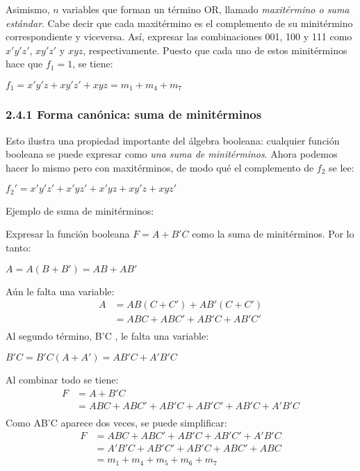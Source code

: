 Asimismo, $n$ variables que forman un t\'{e}rmino OR, llamado
\textit{maxit\'{e}rmino o suma est\'{a}ndar}. Cabe decir que cada
maxit\'{e}rmino es el complemento de su minit\'{e}rmino correspondiente y
viceversa. As\'{i}, expresar las combinaciones 001, 100 y 111 como $x'y'z'$,
$xy'z'$ y $xyz$, respectivamente. Puesto que cada uno de estos minit\'{e}rminos
hace que $f_1 = 1$, se tiene: \begin{center} $f_1 = x'y'z + xy'z' + xyz = m_1 +
        m_4 + m_7$ \end{center}

\subsubsection*{2.4.1 Forma can\'{o}nica: suma de minit\'{e}rminos}
\begin{flushleft} Esto ilustra una propiedad importante del \'{a}lgebra booleana:
    cualquier funci\'{o}n booleana se puede expresar como \textit{una suma de
    minit\'{e}rminos}. Ahora podemos hacer lo mismo pero con maxit\'{e}rminos, de
    modo qu\'{e} el complemento de $f_2$ se lee: \end{flushleft} \begin{center}
    $f_2' = x'y'z' +x'yz' + x'yz + xy'z + xyz'$ \end{center}

Ejemplo de suma de minit\'{e}rminos: \begin{flushleft} Expresar la funci\'{o}n
    booleana $F = A + B'C$ como la suma de minit\'{e}rminos. Por lo tanto:
    \begin{center} $A = A(B + B') = AB + AB'$ \end{center} A\'{u}n le falta una
    variable: \begin{align*} A & = AB(C + C') + AB'(C + C') \\ &= ABC + ABC' + AB'C +
               AB'C'                          \\\end{align*} Al segundo t\'{e}rmino, B'C , le falta una variable:
    \begin{center} $B'C = B'C(A + A') = AB'C + A'B'C$ \end{center} Al combinar todo
    se tiene: \begin{align*} F & = A + B'C \\ &= ABC + ABC' + AB'C + AB'C' + AB'C +
               A'B'C         \\\end{align*} Como AB'C aparece dos veces, se puede simplificar:
    \begin{align*} F & = ABC + ABC' + AB'C + AB'C' + A'B'C \\ &= A'B'C + AB'C' + AB'C
               + ABC' + ABC                            \\ &= m_1 + m_4 + m_5 + m_6 + m_7\end{align*} \end{flushleft}

